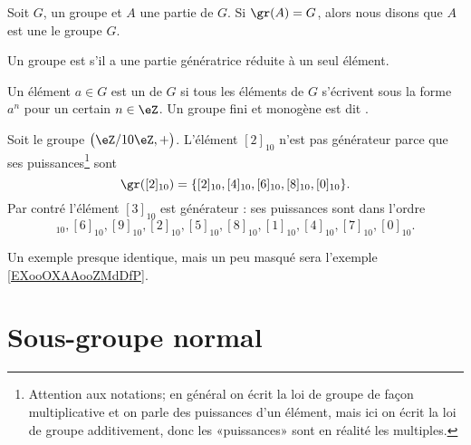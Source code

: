 \begin{definition}  \label{DEFooWMFVooLDqVxR}
    Soit \( G\), un groupe et \( A\) une partie de \( G\). Si \( \gr(A)=G\), alors nous disons que \( A\) est une  le groupe \( G\).

    Un groupe est  s'il a une partie génératrice réduite à un seul élément.
\end{definition}

\begin{definition}     \label{DefHFJWooFxkzCF}
    Un élément \( a\in G\) est un  de \( G\) si tous les éléments de \( G\) s'écrivent sous la forme \( a^n\) pour un certain \( n\in\eZ\). Un groupe fini et monogène est dit .
\end{definition}

\begin{definition}
    Soit le groupe \( \big( \eZ/10\eZ,+ \big)\). L'élément \( [2]_{10}\) n'est pas générateur parce que ses puissances\footnote{Attention aux notations; en général on écrit la loi de groupe de façon multiplicative et on parle des puissances d'un élément, mais ici on écrit la loi de groupe additivement, donc les «puissances» sont en réalité les multiples.} sont
    \begin{equation}
        \gr([2]_{10})=\{ [2]_{10},[4]_{10},[6]_{10},[8]_{10},[0]_{10} \}.
    \end{equation}
    Par contré l'élément \( [3]_{10}\) est générateur : ses puissances sont dans l'ordre
    \begin{equation}
        [3]_{10}, [6]_{10}, [9]_{10}, [2]_{10}, [5]_{10}, [8]_{10},[1]_{10},[4]_{10},[7]_{10},[0]_{10}.
    \end{equation}
\end{definition}

Un exemple presque identique, mais un peu masqué sera l'exemple \ref{EXooOXAAooZMdDfP}.

\section{Sous-groupe normal}

